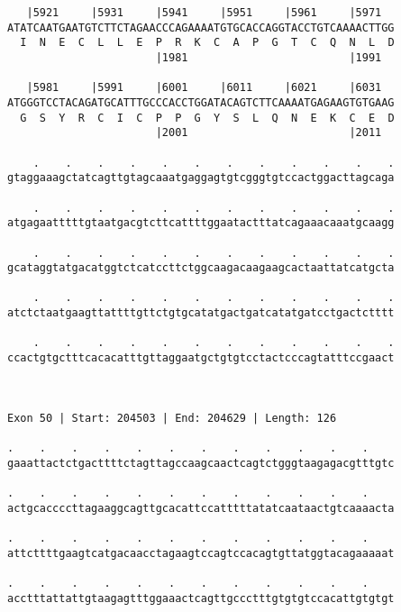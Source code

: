\documentclass{article}
\begin{document}
\begin{Verbatim}
   |5921     |5931     |5941     |5951     |5961     |5971  
ATATCAATGAATGTCTTCTAGAACCCAGAAAATGTGCACCAGGTACCTGTCAAAACTTGG
  I  N  E  C  L  L  E  P  R  K  C  A  P  G  T  C  Q  N  L  D
                       |1981                         |1991  
  
   |5981     |5991     |6001     |6011     |6021     |6031  
ATGGGTCCTACAGATGCATTTGCCCACCTGGATACAGTCTTCAAAATGAGAAGTGTGAAG
  G  S  Y  R  C  I  C  P  P  G  Y  S  L  Q  N  E  K  C  E  D
                       |2001                         |2011  
  
    .    .    .    .    .    .    .    .    .    .    .    .
gtaggaaagctatcagttgtagcaaatgaggagtgtcgggtgtccactggacttagcaga
                                                            
    .    .    .    .    .    .    .    .    .    .    .    .
atgagaatttttgtaatgacgtcttcattttggaatactttatcagaaacaaatgcaagg
                                                            
    .    .    .    .    .    .    .    .    .    .    .    .
gcataggtatgacatggtctcatccttctggcaagacaagaagcactaattatcatgcta
                                                            
    .    .    .    .    .    .    .    .    .    .    .    .
atctctaatgaagttattttgttctgtgcatatgactgatcatatgatcctgactctttt
                                                            
    .    .    .    .    .    .    .    .    .    .    .    .
ccactgtgctttcacacatttgttaggaatgctgtgtcctactcccagtatttccgaact
                                                            
                                                            
 
Exon 50 | Start: 204503 | End: 204629 | Length: 126
 
.    .    .    .    .    .    .    .    .    .    .    .    
gaaattactctgacttttctagttagccaagcaactcagtctgggtaagagacgtttgtc
                                                            
.    .    .    .    .    .    .    .    .    .    .    .    
actgcaccccttagaaggcagttgcacattccatttttatatcaataactgtcaaaacta
                                                            
.    .    .    .    .    .    .    .    .    .    .    .    
attcttttgaagtcatgacaacctagaagtccagtccacagtgttatggtacagaaaaat
                                                            
.    .    .    .    .    .    .    .    .    .    .    .    
acctttattattgtaagagtttggaaactcagttgccctttgtgtgtccacattgtgtgt
                                                            

\end{Verbatim}
\end{document}
